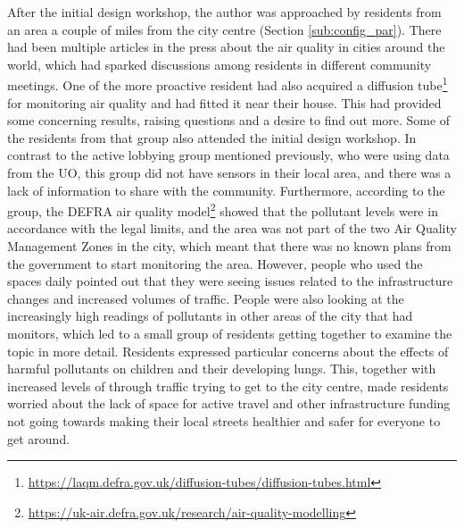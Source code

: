 After the initial design workshop, the author was approached by residents from an area a couple of miles from the city centre (Section \ref{sub:config_par}). There had been multiple articles in the press about the air quality in cities around the world, which had sparked discussions among residents in different community meetings. One of the more proactive resident had also acquired a diffusion tube\footnote{\url{https://laqm.defra.gov.uk/diffusion-tubes/diffusion-tubes.html}} for monitoring air quality and had fitted it near their house. This had provided some concerning results, raising questions and a desire to find out more. Some of the residents from that group also attended the initial design workshop. In contrast to the active lobbying group mentioned previously, who were using data from the UO, this group did not have sensors in their local area, and there was a lack of information to share with the community. Furthermore, according to the group, the DEFRA air quality model\footnote{\url{https://uk-air.defra.gov.uk/research/air-quality-modelling}} showed that the pollutant levels were in accordance with the legal limits, and the area was not part of the two Air Quality Management Zones in the city, which meant that there was no known plans from the government to start monitoring the area. However, people who used the spaces daily pointed out that they were seeing issues related to the infrastructure changes and increased volumes of traffic. People were also looking at the increasingly high readings of pollutants in other areas of the city that had monitors, which led to a small group of residents getting together to examine the topic in more detail. Residents expressed particular concerns about the effects of harmful pollutants on children and their developing lungs. This, together with increased levels of through traffic trying to get to the city centre, made residents worried about the lack of space for active travel and other infrastructure funding not going towards making their local streets healthier and safer for everyone to get around.

